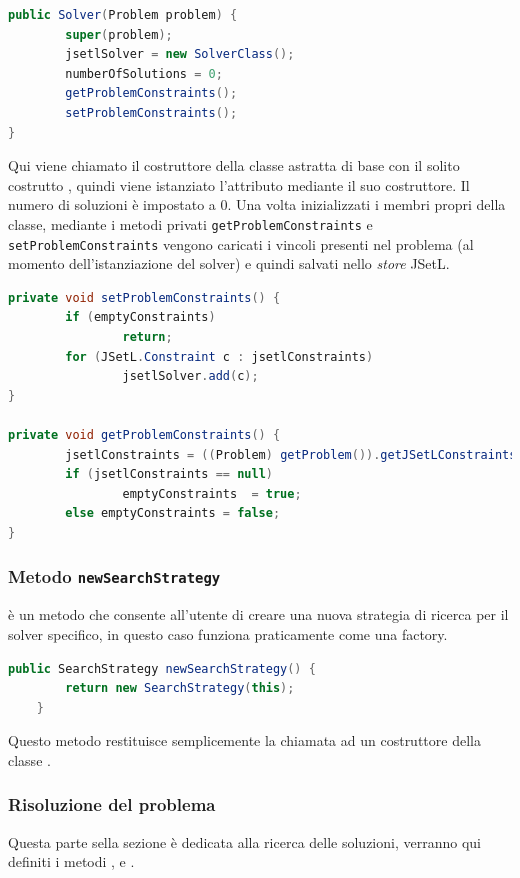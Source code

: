 \begin{lstlisting}[language = Java,
                   caption = {costruttore di base.}]
public Solver(Problem problem) {
        super(problem);
        jsetlSolver = new SolverClass();
        numberOfSolutions = 0;
        getProblemConstraints();
        setProblemConstraints();
}
\end{lstlisting}
Qui viene chiamato il costruttore della classe astratta di base con il solito
costrutto , quindi viene istanziato l'attributo
 mediante il suo costruttore. Il numero di soluzioni è
impostato a $0$. Una volta inizializzati i membri propri della classe, mediante
i metodi privati \texttt{getProblemConstraints} e \texttt{setProblemConstraints}
vengono caricati i vincoli presenti nel problema (al momento dell'istanziazione
del solver) e quindi salvati nello \emph{store} JSetL.

\begin{lstlisting}[language = Java,
                   caption = {metodi privati per caricare i vincoli.}]
private void setProblemConstraints() {
        if (emptyConstraints) 
                return;
        for (JSetL.Constraint c : jsetlConstraints)
                jsetlSolver.add(c);
}

private void getProblemConstraints() {
        jsetlConstraints = ((Problem) getProblem()).getJSetLConstraints();
        if (jsetlConstraints == null)
                emptyConstraints  = true;
        else emptyConstraints = false;
}
\end{lstlisting}


\subsubsection{Metodo \texttt{newSearchStrategy}}
 è un metodo che consente all'utente di creare una 
nuova strategia di ricerca
per il solver specifico,  in questo caso funziona praticamente 
come una factory.
\begin{lstlisting}[language = Java,
                   caption = {\files{newSearchStrategy}.}]
	public SearchStrategy newSearchStrategy() {
		return new SearchStrategy(this);
	}
\end{lstlisting}
Questo metodo restituisce semplicemente la chiamata ad un costruttore della
classe .

\subsubsection{Risoluzione del problema}
Questa parte sella sezione è dedicata alla ricerca delle soluzioni, verranno qui
definiti i metodi ,   e 
.

